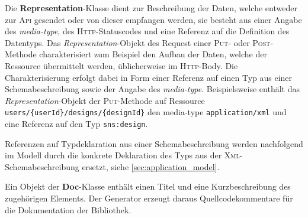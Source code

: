 Die \textbf{Representation}-Klasse dient zur Beschreibung der Daten, welche entweder zur \textsc{Api} gesendet oder von dieser empfangen werden, sie besteht aus einer Angabe des \emph{media-type}, des \textsc{Http}-Statuscodes und eine Referenz auf die Definition des Datentyps. Das \emph{Representation}-Objekt des Request einer \textsc{Put}- oder \textsc{Post}-Methode charakterisiert zum Beispiel den Aufbau der Daten, welche der Ressource übermittelt werden, üblicherweise im \textsc{Http}-Body. Die Charakterisierung erfolgt dabei in Form einer Referenz auf einen Typ aus einer Schemabeschreibung sowie der Angabe des \emph{media-type}. Beispielsweise enthält das \emph{Representation}-Objekt der \textsc{Put}-Methode auf Ressource \texttt{users/\{userId\}/designs/\{designId\}} den media-type \texttt{application/xml} und eine Referenz auf den Typ \texttt{sns:design}. 

Referenzen auf Typdeklaration aus einer Schemabeschreibung werden nachfolgend im Modell durch die konkrete Deklaration des Typs aus der \textsc{Xml}-Schemabeschreibung ersetzt, siehe \cref{sec:application_model}. 

Ein Objekt der \textbf{Doc}-Klasse enthält einen Titel und eine Kurzbeschreibung des zugehörigen Elements.
Der Generator erzeugt daraus Quellcodekommentare für die Dokumentation der Bibliothek.
